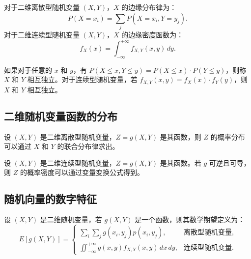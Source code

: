 \documentclass[UTF8]{ctexart}
\begin{document}
	\begin{tcolorbox}[colback=definition!5!white, colframe=definition!75!black, title=边缘分布律和边缘密度函数]
		对于二维离散型随机变量 $(X, Y)$，$X$ 的边缘分布律为：
		\[
		P(X = x_i) = \sum_{j} P(X = x_i, Y = y_j).
		\]
		对于二维连续型随机变量 $(X, Y)$，$X$ 的边缘密度函数为：
		\[
		f_X(x) = \int_{-\infty}^{+\infty} f_{X,Y}(x, y) \, dy.
		\]
	\end{tcolorbox}
	
	\begin{tcolorbox}[colback=definition!5!white, colframe=definition!75!black, title=随机变量的相互独立性]
		如果对于任意的 $x$ 和 $y$，有 $P(X \leq x, Y \leq y) = P(X \leq x) \cdot P(Y \leq y)$，则称 $X$ 和 $Y$ 相互独立。对于连续型随机变量，若 $f_{X,Y}(x, y) = f_X(x) \cdot f_Y(y)$，则 $X$ 和 $Y$ 相互独立。
	\end{tcolorbox}
	
	\subsection{二维随机变量函数的分布}
	
	\begin{tcolorbox}[colback=definition!5!white, colframe=definition!75!black, title=二维离散型随机变量函数的分布]
		设 $(X, Y)$ 是二维离散型随机变量，$Z = g(X, Y)$ 是其函数，则 $Z$ 的概率分布可以通过 $X$ 和 $Y$ 的联合分布律求出。
	\end{tcolorbox}
	
	\begin{tcolorbox}[colback=definition!5!white, colframe=definition!75!black, title=二维连续型随机变量函数的分布]
		设 $(X, Y)$ 是二维连续型随机变量，$Z = g(X, Y)$ 是其函数。若 $g$ 可逆且可导，则 $Z$ 的概率密度可以通过变量变换公式得到。
	\end{tcolorbox}
	
	\subsection{随机向量的数字特征}
	
	\begin{tcolorbox}[colback=definition!5!white, colframe=definition!75!black, title=二维随机变量函数的数学期望]
		设 $(X, Y)$ 是二维随机变量，若 $g(X, Y)$ 是一个函数，则其数学期望定义为：
		\[
		E[g(X, Y)] = 
		\begin{cases}
			\sum_{i} \sum_{j} g(x_i, y_j) p(x_i, y_j), & \text{离散型随机变量}, \\
			\iint_{-\infty}^{+\infty} g(x, y) f_{X,Y}(x, y) \, dx \, dy, & \text{连续型随机变量}.
		\end{cases}
		\]
	\end{tcolorbox}
	
\end{document}
